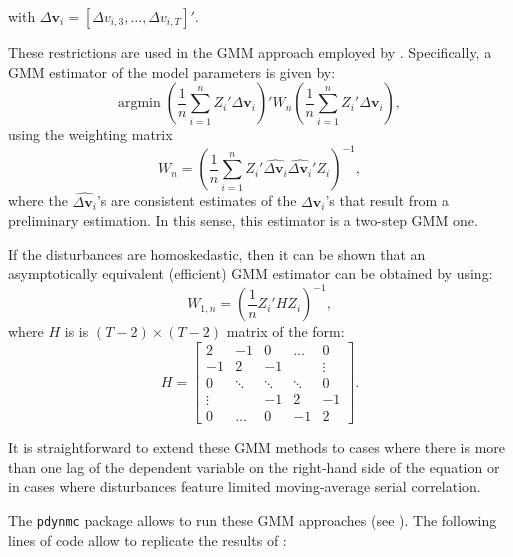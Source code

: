 \documentclass[
  12pt,
]{book}
\theoremstyle{definition}
\theoremstyle{definition}
\theoremstyle{definition}
\theoremstyle{definition}
\theoremstyle{remark}
\begin{document}
with \(\Delta\mathbf{v}_i = [ \Delta v_{i,3},\dots,\Delta v_{i,T}]'\).

These restrictions are used in the GMM approach employed by \citet{Arellano_Bond_1991}. Specifically, a GMM estimator of the model parameters is given by:
\[
\mbox{argmin}\;\left(\frac{1}{n} \sum_{i=1}^n Z_i' \Delta \mathbf{v}_i\right)'W_n\left(\frac{1}{n} \sum_{i=1}^n Z_i' \Delta \mathbf{v}_i\right),
\]
using the weighting matrix
\[
W_n = \left(\frac{1}{n}\sum_{i=1}^n Z_i'\widehat{\Delta\mathbf{v}_i}\widehat{\Delta\mathbf{v}_i}'Z_i\right)^{-1},
\]
where the \(\widehat{\Delta\mathbf{v}_i}\)'s are consistent estimates of the \(\Delta\mathbf{v}_i\)'s that result from a preliminary estimation. In this sense, this estimator is a two-step GMM one.

If the disturbances are homoskedastic, then it can be shown that an asymptotically equivalent (efficient) GMM estimator can be obtained by using:
\[
W_{1,n} = \left(\frac{1}{n}Z_i'HZ_i\right)^{-1},
\]
where \(H\) is is \((T-2) \times (T-2)\) matrix of the form:
\[
H = \left[\begin{array}{ccccccc}
2 & -1 & 0 & \dots &0 \\
-1 & 2 & -1 &  & \vdots \\
0 & \ddots& \ddots & \ddots & 0 \\
\vdots &  & -1 & 2&-1\\
0&\dots & 0 & -1 & 2
\end{array}\right].
\]

It is straightforward to extend these GMM methods to cases where there is more than one lag of the dependent variable on the right-hand side of the equation or in cases where disturbances feature limited moving-average serial correlation.

The \texttt{pdynmc} package allows to run these GMM approaches (see \citet{Fritsch_et_al_2019}). The following lines of code allow to replicate the results of \citet{Arellano_Bond_1991}:
\end{document}

